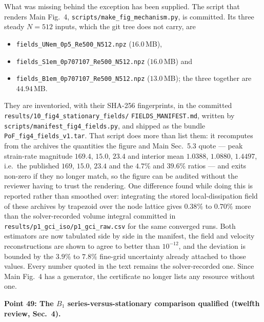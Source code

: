 \documentclass[11pt,a4paper]{article}
\newcommand{\brk}{\hspace{0pt}}
\begin{document}
What was missing behind the exception has been supplied. The script that renders Main
Fig.~4, \texttt{scripts/}\brk\texttt{make\_fig\_mechanism.py}, is committed. Its three
steady \(N=512\) inputs, which the git tree does not carry, are
\begin{itemize}
\item \texttt{fields\_UNem\_0p5\_Re500\_N512.npz} ($16.0$\,MB),
\item \texttt{fields\_S1em\_0p707107\_Re500\_N512.npz} ($16.0$\,MB) and
\item \texttt{fields\_B1em\_0p707107\_Re500\_N512.npz} ($13.0$\,MB); the three together
  are $44.94$\,MB.
\end{itemize}
They are inventoried, with their SHA-256 fingerprints, in the committed
\texttt{results/10\_fig4}\brk\texttt{\_stationary\_fields/}\brk%
\texttt{FIELDS}\brk\texttt{\_MANIFEST.md}, written by
\texttt{scripts/}\brk\texttt{manifest\_fig4\_fields.py}, and shipped as the bundle
\texttt{PoF\_fig4}\brk\texttt{\_fields\_v1.tar}. That script does more than list them: it
recomputes from the archives the quantities the figure and Main Sec.~5.3 quote --- peak
strain-rate magnitude \(169.4\), \(15.0\), \(23.4\) and interior mean \(1.0388\),
\(1.0880\), \(1.4497\), i.e.\ the published \(169\), \(15.0\), \(23.4\) and the
\(4.7\%\) and \(39.6\%\) ratios --- and exits non-zero if they no longer match, so the
figure can be audited without the reviewer having to trust the rendering. One difference
found while doing this is reported rather than smoothed over: integrating the stored
local-dissipation field of these archives by trapezoid over the node lattice gives
\(0.38\%\) to \(0.70\%\) more than the solver-recorded volume integral committed in
\texttt{results/p1\_gci\_iso/p1\_gci\_raw.csv} for the same converged runs. Both estimators
are now tabulated side by side in the manifest, the field and velocity reconstructions are
shown to agree to better than \(10^{-12}\), and the deviation is bounded by the
\(3.9\%\) to \(7.8\%\) fine-grid uncertainty already attached to those values. Every
number quoted in the text remains the solver-recorded one. Since Main Fig.~4 has a
generator, the certificate no longer lists any resource without one.

\vspace{1em}

\noindent\textbf{Point 49: The \(B_1\) series-versus-stationary comparison qualified
(twelfth review, Sec.~4).}
\end{document}
